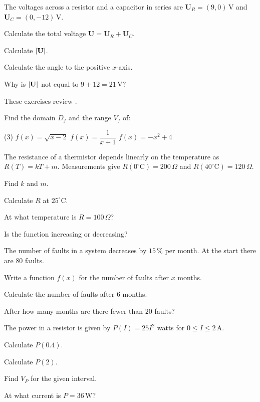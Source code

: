 The voltages across a resistor and a capacitor in series are
$\mathbf{U}_R = (9, 0)\,\text{V}$ and $\mathbf{U}_C = (0, -12)\,\text{V}$.
\begin{parts}
  \item Calculate the total voltage $\mathbf{U} = \mathbf{U}_R + \mathbf{U}_C$.
  \item Calculate $\lvert\mathbf{U}\rvert$.
  \item Calculate the angle to the positive $x$-axis.
  \item Why is $\lvert\mathbf{U}\rvert$ not equal to $9 + 12 = 21\,\text{V}$?
\end{parts}

These exercises review .

Find the domain $D_f$ and the range $V_f$ of:
\begin{delar}(3)
  \task $f(x) = \sqrt{x - 2}$
  \task $f(x) = \dfrac{1}{x + 1}$
  \task $f(x) = -x^2 + 4$
\end{delar}

The resistance of a thermistor depends linearly on the temperature as $R(T) = kT + m$.
Measurements give $R(0^{\circ}\text{C}) = 200\,\Omega$ and $R(40^{\circ}\text{C}) = 120\,\Omega$.
\begin{parts}
  \item Find $k$ and $m$.
  \item Calculate $R$ at $25^{\circ}\text{C}$.
  \item At what temperature is $R = 100\,\Omega$?
  \item Is the function increasing or decreasing?
\end{parts}

The number of faults in a system decreases by $15\,\%$ per month. At the start there are $80$
faults.
\begin{parts}
  \item Write a function $f(x)$ for the number of faults after $x$ months.
  \item Calculate the number of faults after $6$ months.
  \item After how many months are there fewer than $20$ faults?
\end{parts}

The power in a resistor is given by $P(I) = 25I^2$ watts for $0 \leq I \leq 2\,\text{A}$.
\begin{parts}
  \item Calculate $P(0.4)$.
  \item Calculate $P(2)$.
  \item Find $V_P$ for the given interval.
  \item At what current is $P = 36\,\text{W}$?
\end{parts}

